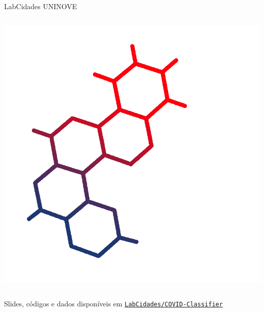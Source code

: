 \documentclass[aspectratio=169]{beamer}                    %
\begin{document}
\begin{frame}{LabCidades UNINOVE}
\begin{columns}
\begin{column}{0.2\textwidth}
            \includegraphics[width=1.0\columnwidth]{LabCidades.png}
        \end{column}
    \end{columns}
    \centering
    Slides, códigos e dados disponíveis em \href{https://github.com/LabCidades/COVID-Classifier}{\texttt{LabCidades/COVID-Classifier}}
\end{frame}
\end{document}
